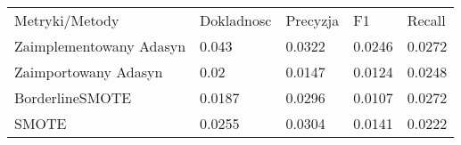 \begin{tabular}{lllll}
\hline
 Metryki/Metody          & Dokladnosc & Precyzja & F1     & Recall \\
 Zaimplementowany Adasyn & 0.043      & 0.0322   & 0.0246 & 0.0272 \\
 Zaimportowany Adasyn    & 0.02       & 0.0147   & 0.0124 & 0.0248 \\
 BorderlineSMOTE         & 0.0187     & 0.0296   & 0.0107 & 0.0272 \\
 SMOTE                   & 0.0255     & 0.0304   & 0.0141 & 0.0222 \\
\hline
\end{tabular}